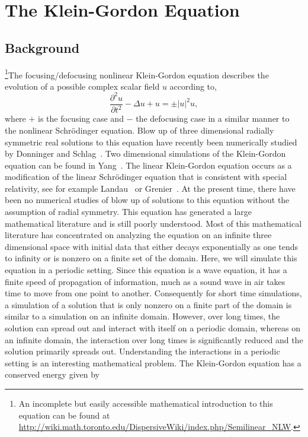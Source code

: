 \chapter{The Klein-Gordon Equation}

\section{Background}

\footnote{An incomplete but easily accessible mathematical introduction to this equation can be found at \url{http://wiki.math.toronto.edu/DispersiveWiki/index.php/Semilinear_NLW}.}The focusing/defocusing nonlinear Klein-Gordon equation describes the evolution of a possible complex scalar field $u$ according to, 
\begin{equation}\label{eq:KleinGordon}
\frac{\partial^2 u}{\partial t^2} - \Delta u +u = \pm \lvert u\rvert^2u,
\end{equation}
where $+$  is the focusing case and $-$ the defocusing case in a similar manner to the nonlinear Schr\"{o}dinger equation. Blow up of three dimensional radially symmetric real solutions to this equation have recently been numerically studied by Donninger and Schlag~\cite{DonSch11}. Two dimensional simulations of the Klein-Gordon equation can be found in Yang~\cite{Yan06}. The linear Klein-Gordon equation occurs as a modification of the linear Schr\"{o}dinger equation that is consistent with special relativity, see for example Landau~\cite{Lan96} or Grenier~\cite{Gre94}. At the present time, there have been no numerical studies of blow up of solutions to this equation without the assumption of radial symmetry. This equation has generated a large mathematical literature and is still poorly understood. Most of this mathematical literature has concentrated on analyzing the equation on an infinite three dimensional space with initial data that either decays exponentially as one tends to infinity or is nonzero on a finite set of the domain. Here, we will simulate this equation in a periodic setting. Since this equation is a wave equation, it has a finite speed of propagation of information, much as a sound wave in air takes time to move from one point to another. Consequently for short time simulations, a simulation of a solution that is only nonzero on a finite part of the domain is similar to a simulation on an infinite domain. However, over long times, the solution can spread out and interact with itself on a periodic domain, whereas on an infinite domain,  the interaction over long times is significantly reduced and the solution primarily spreads out. Understanding the interactions in a periodic setting is an interesting mathematical problem. The Klein-Gordon equation has a conserved energy given by
